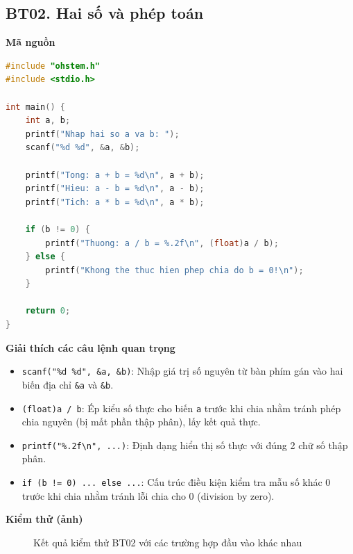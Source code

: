 \subsection*{BT02. Hai số và phép toán}

\noindent\textbf{Mã nguồn}\\
\begin{lstlisting}[language=C]
#include "ohstem.h"
#include <stdio.h>

int main() {
    int a, b;
    printf("Nhap hai so a va b: ");
    scanf("%d %d", &a, &b);

    printf("Tong: a + b = %d\n", a + b);
    printf("Hieu: a - b = %d\n", a - b);
    printf("Tich: a * b = %d\n", a * b);

    if (b != 0) {
        printf("Thuong: a / b = %.2f\n", (float)a / b);
    } else {
        printf("Khong the thuc hien phep chia do b = 0!\n");
    }

    return 0;
}
\end{lstlisting}

\noindent\textbf{Giải thích các câu lệnh quan trọng}\\
\begin{itemize}
    \item \texttt{scanf("\%d \%d", \&a, \&b)}: Nhập giá trị số nguyên từ bàn phím gán vào hai biến địa chỉ \texttt{\&a} và \texttt{\&b}.
    \item \texttt{(float)a / b}: Ép kiểu số thực cho biến \texttt{a} trước khi chia nhằm tránh phép chia nguyên (bị mất phần thập phân), lấy kết quả thực.
    \item \texttt{printf("\%.2f\textbackslash n", ...)}: Định dạng hiển thị số thực với đúng 2 chữ số thập phân.
    \item \texttt{if (b != 0) ... else ...}: Cấu trúc điều kiện kiểm tra mẫu số khác 0 trước khi chia nhằm tránh lỗi chia cho 0 (division by zero).
\end{itemize}

\noindent\textbf{Kiểm thử (ảnh)}\\
\begin{figure}[H]
    \centering
    \caption{Kết quả kiểm thử BT02 với các trường hợp đầu vào khác nhau}
    \label{fig:bt02}
\end{figure}

